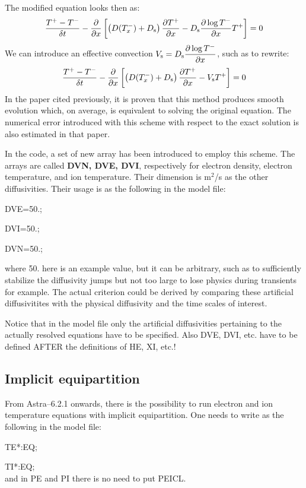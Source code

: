 The modified equation looks then as:
\begin{eqnarray}
\frac{T^+-T^-}{\delta t} - \frac{\partial }{\partial x}\left[\left(D(T_x^-)+D_{\rm s}\right)\frac{\partial T^+}{\partial x}-D_{\rm s}\frac{\partial \log T^-}{\partial x} T^+\right] =0
\end{eqnarray}
We can introduce an effective convection $\displaystyle V_{\rm s}=D_{\rm s}\frac{\partial \log T^-}{\partial x}$, such as to rewrite:
\begin{eqnarray}
\frac{T^+-T^-}{\delta t} - \frac{\partial }{\partial x}\left[\left(D(T_x^-)+D_{\rm s}\right)\frac{\partial T^+}{\partial x}-V_{\rm s} T^+\right] =0
\end{eqnarray}
In the paper cited previously, it is proven that this method produces smooth evolution which, on average, is 
equivalent to solving the original equation. The numerical error introduced with this scheme with respect to the
exact solution is also estimated in that paper.

In the code, a set of new array has been introduced to employ this scheme. The arrays are called {\bf DVN, DVE, DVI}, respectively for electron density, electron temperature, and ion temperature. Their dimension is m$^2$/s as the other diffusivities.
Their usage is as the following in the model file:

DVE=50.;

DVI=50.;

DVN=50.;

where 50. here is an example value, but it can be arbitrary, such as to sufficiently stabilize the diffusivity jumps but not too large to lose physics during transients for example. The actual criterion could be derived by comparing these artificial diffusivitites with the physical diffusivity and the time scales of interest.

Notice that in the model file only the artificial diffusivities pertaining to the actually resolved equations have to be specified. Also DVE, DVI, etc. have to be defined AFTER the definitions of HE, XI, etc.!
%
\subsection{Implicit equipartition}
From Astra--6.2.1 onwards, there is the possibility to run electron and ion temperature equations with implicit 
equipartition. One needs to write as the following in the model file:

TE*:EQ;

TI*:EQ;\\
and in PE and PI there is no need to put PEICL.







%
\clearpage
